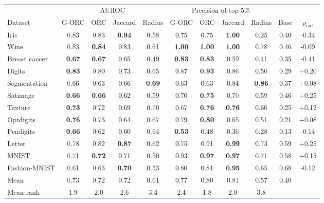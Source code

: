 \begin{tabular}{@{}lcccccccccc@{}}
\toprule
 & \multicolumn{4}{c}{AUROC} & \multicolumn{4}{c}{Precision of top 5\%} & & \\
\cmidrule(lr){2-5}\cmidrule(lr){6-9}
Dataset & G-ORC & ORC & Jaccard & Radius & G-ORC & ORC & Jaccard & Radius & Base & $\rho_{\mathrm{rad}}$ \\
\midrule
Iris & 0.83 & 0.83 & \textbf{0.94} & 0.58 & 0.75 & 0.75 & \textbf{1.00} & 0.25 & 0.40 & -0.34 \\
Wine & 0.83 & \textbf{0.84} & 0.83 & 0.61 & \textbf{1.00} & \textbf{1.00} & \textbf{1.00} & 0.78 & 0.46 & -0.09 \\
Breast cancer & \textbf{0.67} & \textbf{0.67} & 0.65 & 0.49 & \textbf{0.83} & \textbf{0.83} & 0.59 & 0.41 & 0.35 & -0.41 \\
Digits & \textbf{0.83} & 0.80 & 0.73 & 0.65 & 0.87 & \textbf{0.93} & 0.86 & 0.50 & 0.29 & +0.20 \\
Segmentation & 0.66 & 0.63 & 0.66 & \textbf{0.69} & 0.63 & 0.63 & 0.84 & \textbf{0.86} & 0.37 & +0.08 \\
Satimage & \textbf{0.66} & \textbf{0.66} & 0.62 & 0.59 & 0.70 & \textbf{0.75} & 0.70 & 0.59 & 0.46 & +0.25 \\
Texture & \textbf{0.73} & 0.72 & 0.69 & 0.70 & 0.67 & \textbf{0.76} & \textbf{0.76} & 0.60 & 0.25 & +0.12 \\
Optdigits & \textbf{0.76} & 0.73 & 0.64 & 0.67 & 0.79 & \textbf{0.80} & 0.65 & 0.51 & 0.21 & +0.08 \\
Pendigits & \textbf{0.66} & 0.62 & 0.60 & 0.64 & \textbf{0.53} & 0.48 & 0.36 & 0.28 & 0.13 & -0.14 \\
Letter & 0.78 & 0.82 & \textbf{0.87} & 0.62 & 0.75 & 0.91 & \textbf{0.99} & 0.73 & 0.59 & +0.25 \\
MNIST & 0.71 & \textbf{0.72} & 0.71 & 0.50 & 0.93 & \textbf{0.97} & \textbf{0.97} & 0.71 & 0.58 & +0.15 \\
Fashion-MNIST & 0.61 & 0.63 & \textbf{0.70} & 0.53 & 0.80 & 0.81 & \textbf{0.95} & 0.65 & 0.68 & -0.12 \\
\midrule
Mean & 0.73 & 0.72 & 0.72 & 0.61 & 0.77 & 0.80 & 0.81 & 0.57 & 0.40 &  \\
Mean rank & 1.9 & 2.0 & 2.6 & 3.4 & 2.4 & 1.8 & 2.0 & 3.8 & &  \\
\bottomrule
\end{tabular}
